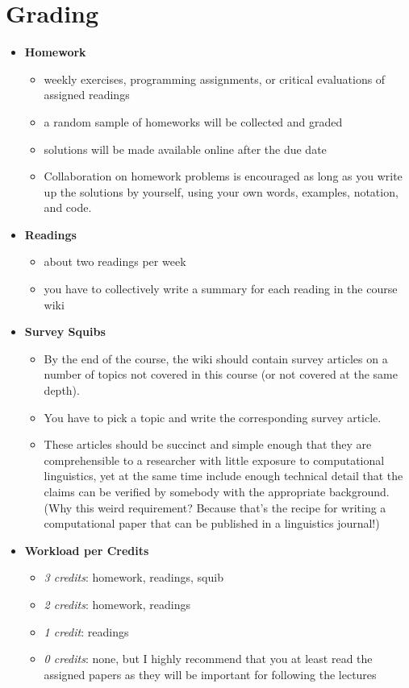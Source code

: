 \section{Grading}
\begin{itemize}
    \item \textbf{Homework}
        \begin{itemize}
            \item weekly exercises, programming assignments, or critical evaluations of assigned readings
            \item a random sample of homeworks will be collected and graded
            \item solutions will be made available online after the due date
            \item Collaboration on homework problems is encouraged as long as you write up the solutions by yourself, using your own words, examples, notation, and code.
        \end{itemize}
    \item \textbf{Readings}
        \begin{itemize}
            \item about two readings per week
            \item you have to collectively write a summary for each reading in the course wiki
        \end{itemize}
    \item \textbf{Survey Squibs}
        \begin{itemize}
            \item By the end of the course, the wiki should contain survey articles on a number of topics not covered in this course (or not covered at the same depth).
            \item You have to pick a topic and write the corresponding survey article.
            \item These articles should be succinct and simple enough that they are comprehensible to a researcher with little exposure to computational linguistics, yet at the same time include enough technical detail that the claims can be verified by somebody with the appropriate background.
                (Why this weird requirement?
                Because that's the recipe for writing a computational paper that can be published in a linguistics journal!)
        \end{itemize}
    \item \textbf{Workload per Credits}
        \begin{itemize}
            \item \emph{3 credits}: homework, readings, squib
            \item \emph{2 credits}: homework, readings
            \item \emph{1 credit}: readings
            \item \emph{0 credits}: none, but I highly recommend that you at least read the assigned papers as they will be important for following the lectures
        \end{itemize}
\end{itemize}


